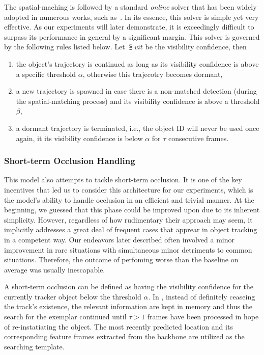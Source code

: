The spatial-maching is followed by a standard \emph{online} solver that has been widely adopted in numerous works, such as~\cite{bawley2016simple, wojke2017simple, zhou2020tracking, bergmann2019tracking}. In its essence, this solver is simple yet very effective. As our experiments will later demonstrate, it is exceedingly difficult to surpass its performance in general by a significant margin. This solver is governed by the following rules listed below. Let $\subsup{v}{i}{t}$ be the visibility confidence, then
\begin{enumerate}
     \item the object's trajectory is continued as long as its visibility confidence is above a specific threshold $\alpha$, otherwise this trajecotry becomes dormant,
     \item a new trajectory is spawned in case there is a non-matched detection (during the spatial-matching process) and its visibility confidence is above a threshold $\beta$,
     \item a dormant trajectory is terminated, i.e., the object ID will never be used once again, it its visibility confidence is below $\alpha$ for $\tau$ consecutive frames.
\end{enumerate}

\subsubsection{Short-term Occlusion Handling}

This model also attempts to tackle short-term occlusion. It is one of the key incentives that led us to consider this architecture for our experiments, which is the model's ability to handle occlusion in an efficient and trivial manner. At the beginning, we guessed that this phase could be improved upon due to its inherent simplicity. However, regardless of how rudimentary their approach may seem, it implicitly addresses a great deal of frequent cases that apprear in object tracking in a competent way. Our endeavors later described often involved a minor improvement in rare situations with simultaneous minor detriments to common situations. Therefore, the outcome of perfoming worse than the baseline on average was usually inescapable.

A short-term occlusion can be defined as having the visibility confidence for the currently tracker object below the threshold $\alpha$. In \siammot{}, instead of definitely ceaseing the track's existence, the relevant information are kept in memory and thus the search for the exemplar continued until $\tau > 1$ frames have been processed in hope of re-instatiating the object. The most recently predicted location and its corresponding feature frames extracted from the backbone are utilized as the searching template. 

